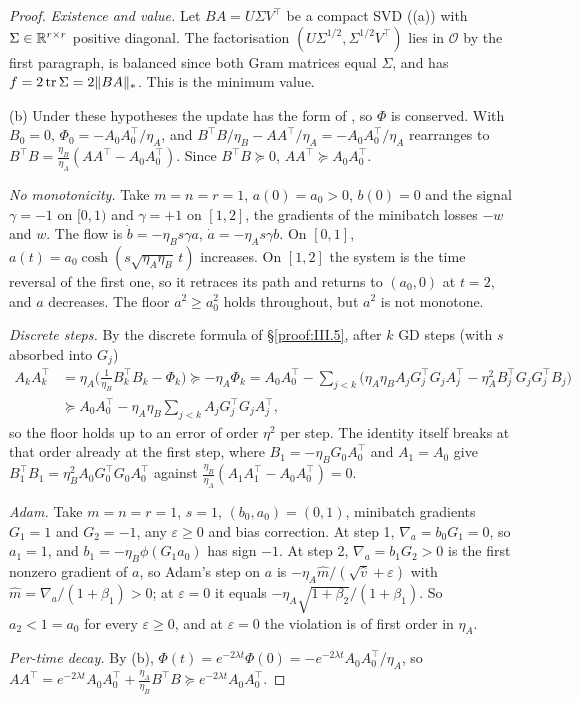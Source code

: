 \begin{proof}
\emph{Existence and value.} Let $BA=U\Sigma V^\top$ be a compact SVD ((a)) with $\Sigma\in\mathbb{R}^{r\times r}$ positive diagonal. The
factorisation $(U\Sigma^{1/2},\Sigma^{1/2}V^\top)$ lies in $\mathcal O$ by the first paragraph, is balanced since both
Gram matrices equal $\Sigma$, and has $f=2\operatorname{tr}\Sigma=2\lVert BA\rVert_*$. This is the minimum value.

(b) Under these hypotheses the update has the form of , so $\Phi$ is conserved. With $B_0=0$,
$\Phi_0=-A_0A_0^\top/\eta_A$, and $B^\top B/\eta_B-AA^\top/\eta_A=-A_0A_0^\top/\eta_A$ rearranges to
$B^\top B=\tfrac{\eta_B}{\eta_A}(AA^\top-A_0A_0^\top)$. Since $B^\top B\succeq0$, $AA^\top\succeq A_0A_0^\top$.

\emph{No monotonicity.} Take $m=n=r=1$, $a(0)=a_0>0$, $b(0)=0$ and the signal $\gamma=-1$ on $[0,1)$ and $\gamma=+1$ on
$[1,2]$, the gradients of the minibatch losses $-w$ and $w$. The flow is $\dot b=-\eta_Bs\gamma a$, $\dot a=-\eta_As\gamma b$.
On $[0,1]$, $a(t)=a_0\cosh(s\sqrt{\eta_A\eta_B}\,t)$ increases. On $[1,2]$ the system is the time reversal of the first one,
so it retraces its path and returns to $(a_0,0)$ at $t=2$, and $a$ decreases. The floor $a^2\ge a_0^2$ holds throughout,
but $a^2$ is not monotone.

\emph{Discrete steps.} By the discrete formula of \S\ref{proof:III.5}, after $k$ GD steps (with $s$ absorbed into $G_j$)
\begin{align*}
A_kA_k^\top&=\eta_A\Big(\tfrac{1}{\eta_B}B_k^\top B_k-\Phi_k\Big)\succeq-\eta_A\Phi_k
=A_0A_0^\top-\sum_{j<k}\big(\eta_A\eta_BA_jG_j^\top G_jA_j^\top-\eta_A^2B_j^\top G_jG_j^\top B_j\big)\\
&\succeq A_0A_0^\top-\eta_A\eta_B\sum_{j<k}A_jG_j^\top G_jA_j^\top,
\end{align*}
so the floor holds up to an error of order $\eta^2$ per step. The identity itself breaks at that order already at the first
step, where $B_1=-\eta_BG_0A_0^\top$ and $A_1=A_0$ give $B_1^\top B_1=\eta_B^2A_0G_0^\top G_0A_0^\top$ against
$\tfrac{\eta_B}{\eta_A}(A_1A_1^\top-A_0A_0^\top)=0$.

\emph{Adam.} Take $m=n=r=1$, $s=1$, $(b_0,a_0)=(0,1)$, minibatch gradients $G_1=1$ and $G_2=-1$, any $\varepsilon\ge0$
and bias correction. At step 1, $\nabla_a=b_0G_1=0$, so $a_1=1$, and $b_1=-\eta_B\phi(G_1a_0)$ has sign $-1$. At step 2,
$\nabla_a=b_1G_2>0$ is the first nonzero gradient of $a$, so Adam's step on $a$ is
$-\eta_A\hat m/(\sqrt{\hat v}+\varepsilon)$ with $\hat m=\nabla_a/(1+\beta_1)>0$; at $\varepsilon=0$ it equals
$-\eta_A\sqrt{1+\beta_2}/(1+\beta_1)$. So $a_2<1=a_0$ for every $\varepsilon\ge0$, and at $\varepsilon=0$ the violation is of first order in $\eta_A$.

\emph{Per-time decay.} By (b), $\Phi(t)=e^{-2\lambda t}\Phi(0)=-e^{-2\lambda t}A_0A_0^\top/\eta_A$,
so $AA^\top=e^{-2\lambda t}A_0A_0^\top+\tfrac{\eta_A}{\eta_B}B^\top B\succeq e^{-2\lambda t}A_0A_0^\top$.
\end{proof}

